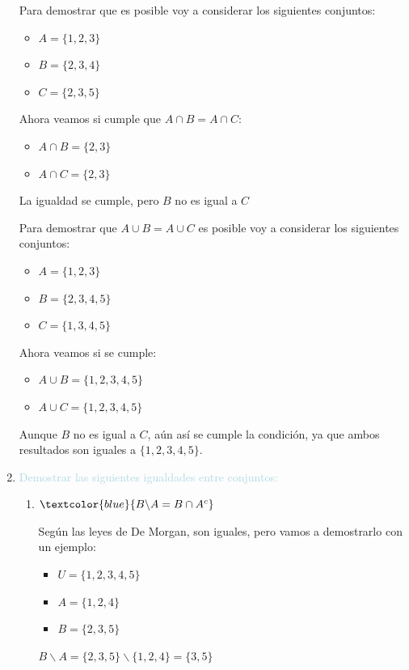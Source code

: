 \documentclass{article}
\newcommand{\lb}[1]{\textcolor{lightblue}{#1}}
\newcommand{\db}[1]{\textcolor{blue}{#1}}
\begin{document}
\begin{enumerate}[label=\color{red}\textbf{\arabic*)},leftmargin=*]
      Para demostrar que es posible voy a considerar los siguientes conjuntos:
      \begin{itemize}[label=$-$]
      \item $A=\{1,2,3\}$
      \item $B=\{2,3,4\}$
      \item $C=\{2,3,5\}$
      \end{itemize}
      Ahora veamos si cumple que $A\cap B=A\cap C:$
      \begin{itemize}[label=$-$]
      \item $A\cap B=\{2,3\}$
      \item $A\cap C=\{2,3\}$
      \end{itemize}
      La igualdad se cumple, pero $B$ no es igual a $C$
      
      Para demostrar que $A\cup B=A\cup C$ es posible voy a considerar los siguientes conjuntos:
      
      \begin{itemize}[label=$-$]
            \item $A=\{1,2,3\}$
            \item $B=\{2,3,4,5\}$
            \item $C=\{1,3,4,5\}$
            \end{itemize}
            Ahora veamos si se cumple:
      \begin{itemize}[label=$-$]
            \item $A\cup B=\{1,2,3,4,5\}$
            \item $A\cup C=\{1,2,3,4,5\}$
            \end{itemize}
       Aunque $B$ no es igual a $C$, aún así se cumple la condición, ya que ambos resultados son iguales a $\{1,2,3,4,5\}$.
      \item \lb{Demostrar las siguientes igualdades entre conjuntos:}
      \begin{enumerate}[label=\color{red}\alph*)]
      	\item $\db{B\backslash A=B\cap A^c}$
      	
      	Según las leyes de De Morgan, son iguales, pero vamos a demostrarlo con un ejemplo:
      	\begin{itemize}[label=$-$]
      	\item $U=\{1,2,3,4,5\}$
      	\item $A=\{1,2,4\}$
      	\item $B=\{2,3,5\}$
      	\end{itemize}
      	$B\backslash A=\{2,3,5\}\backslash\{1,2,4\}=\{3,5\}$
      	

\end{enumerate}
\end{enumerate}
\end{document}
